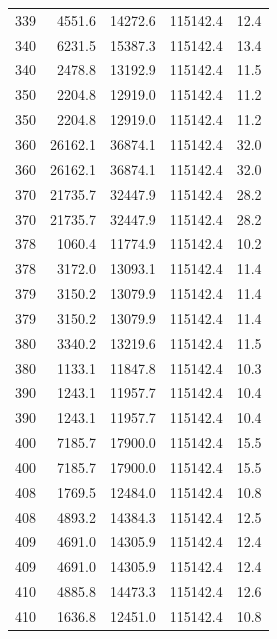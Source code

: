 \begin{longtable}{rrrrr}
    339 & \num{4551.6} & \num{14272.6} & \num{115142.4} & 12.4 \\
    340 & \num{6231.5} & \num{15387.3} & \num{115142.4} & 13.4 \\
    340 & \num{2478.8} & \num{13192.9} & \num{115142.4} & 11.5 \\
    350 & \num{2204.8} & \num{12919.0} & \num{115142.4} & 11.2 \\
    350 & \num{2204.8} & \num{12919.0} & \num{115142.4} & 11.2 \\
    360 & \num{26162.1} & \num{36874.1} & \num{115142.4} & 32.0 \\
    360 & \num{26162.1} & \num{36874.1} & \num{115142.4} & 32.0 \\
    370 & \num{21735.7} & \num{32447.9} & \num{115142.4} & 28.2 \\
    370 & \num{21735.7} & \num{32447.9} & \num{115142.4} & 28.2 \\
    378 & \num{1060.4} & \num{11774.9} & \num{115142.4} & 10.2 \\
    378 & \num{3172.0} & \num{13093.1} & \num{115142.4} & 11.4 \\
    379 & \num{3150.2} & \num{13079.9} & \num{115142.4} & 11.4 \\
    379 & \num{3150.2} & \num{13079.9} & \num{115142.4} & 11.4 \\
    380 & \num{3340.2} & \num{13219.6} & \num{115142.4} & 11.5 \\
    380 & \num{1133.1} & \num{11847.8} & \num{115142.4} & 10.3 \\
    390 & \num{1243.1} & \num{11957.7} & \num{115142.4} & 10.4 \\
    390 & \num{1243.1} & \num{11957.7} & \num{115142.4} & 10.4 \\
    400 & \num{7185.7} & \num{17900.0} & \num{115142.4} & 15.5 \\
    400 & \num{7185.7} & \num{17900.0} & \num{115142.4} & 15.5 \\
    408 & \num{1769.5} & \num{12484.0} & \num{115142.4} & 10.8 \\
    408 & \num{4893.2} & \num{14384.3} & \num{115142.4} & 12.5 \\
    409 & \num{4691.0} & \num{14305.9} & \num{115142.4} & 12.4 \\
    409 & \num{4691.0} & \num{14305.9} & \num{115142.4} & 12.4 \\
    410 & \num{4885.8} & \num{14473.3} & \num{115142.4} & 12.6 \\
    410 & \num{1636.8} & \num{12451.0} & \num{115142.4} & 10.8 \\

\end{longtable}
